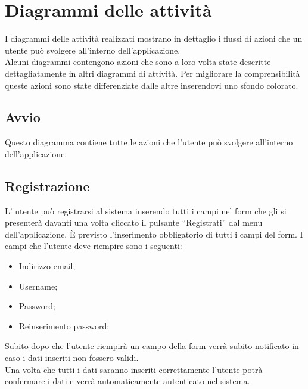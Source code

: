\section{Diagrammi delle attività} 
\label{attivita}
I diagrammi delle attività realizzati mostrano in dettaglio i flussi di azioni che un utente può svolgere all'interno dell'applicazione. \\
Alcuni diagrammi contengono azioni che sono a loro volta state descritte dettagliatamente in altri diagrammi di attività. Per migliorare la comprensibilità queste azioni sono state differenziate dalle altre inserendovi uno sfondo colorato.
\subsection{Avvio}
Questo diagramma contiene tutte le azioni che l'utente può svolgere all'interno dell'applicazione. \\

\subsection{Registrazione}
L' utente può registrarsi al sistema inserendo tutti i campi nel form che gli si presenterà davanti una volta cliccato il pulsante ``Registrati'' dal menu dell'applicazione. È previsto l'inserimento obbligatorio di tutti i campi del form.
I campi che l'utente deve riempire sono i seguenti:
\begin{itemize}
	\item Indirizzo email;
	\item Username;
	\item Password;
	\item Reinserimento password;
\end{itemize}
Subito dopo che l'utente riempirà un campo della form verrà subito notificato in caso i dati inseriti non fossero validi. \\
Una volta che tutti i dati saranno inseriti correttamente l'utente potrà confermare i dati e verrà automaticamente autenticato nel sistema.

